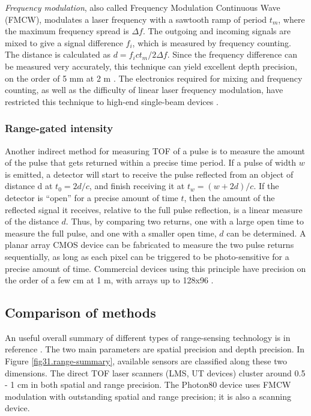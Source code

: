 \documentclass[twocolumn,oneside]{book}
\begin{document}
{\em Frequency modulation}, also called Frequency Modulation
Continuous Wave (FMCW), modulates a laser frequency with a sawtooth
ramp of period $t_m$, where the maximum frequency spread is $\Delta
f$.  The outgoing and incoming signals are mixed to give a signal
difference $f_i$, which is measured by frequency counting.  The
distance is calculated as $d = f_i c t_m / 2 \Delta f$.  Since the
frequency difference can be measured very accurately, this technique
can yield excellent depth precision, on the order of 5 mm at 2 m
\cite{wongIROSxxx}.  The electronics required for mixing and frequency
counting, as well as the difficulty of linear laser frequency
modulation, have restricted this technique to high-end single-beam
devices \cite{FaroPhotonXXX}.

\subsubsection{Range-gated intensity}

Another indirect method for measuring TOF of a pulse is to measure the
amount of the pulse that gets returned within a precise time period.
If a pulse of width $w$ is emitted, a detector will start to receive
the pulse reflected from an object of distance d at $t_0 = 2d/c$, and
finish receiving it at $t_w = (w+2d)/c$.  If the detector is ``open''
for a precise amount of time $t$, then the amount of the reflected
signal it receives, relative to the full pulse reflection, is a linear
measure of the distance $d$.  Thus, by comparing two returns, one with
a large open time to measure the full pulse, and one with a smaller
open time, $d$ can be determined.  A planar array CMOS device can be
fabricated to measure the two pulse returns sequentially, as long as
each pixel can be triggered to be photo-sensitive for a precise amount
of time.  Commercial devices using this principle have precision on
the order of a few cm at 1 m, with arrays up to 128x96
\cite{zcamXXX,tridicamXXX}. 

\subsection{Comparison of methods}

An useful overall summary of different types of range-sensing
technology is in reference \cite{wongIROSXXX}.  The two main
parameters are spatial precision and depth precision.  In Figure
\ref{fig31.range-summary}, available sensors are classified along
these two dimensions.  The direct TOF laser scanners (LMS, UT devices)
cluster around 0.5 - 1 cm in both spatial and range precision.  The
Photon80 device uses FMCW modulation with outstanding spatial and
range precision; it is also a scanning device.  
\end{document}
